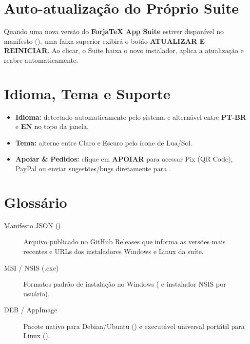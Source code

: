 \documentclass[11pt,a4paper]{article}
\begin{document}
\section{Auto-atualização do Próprio Suite}
Quando uma nova versão do \textbf{ForjaTeX App Suite} estiver disponível no manifesto (), uma faixa superior exibirá o botão \textbf{ATUALIZAR E REINICIAR}. Ao clicar, o Suite baixa o novo instalador, aplica a atualização e reabre automaticamente.

\section{Idioma, Tema e Suporte}
\begin{itemize}
  \item \textbf{Idioma:} detectado automaticamente pelo sistema e alternável entre \textbf{PT-BR} e \textbf{EN} no topo da janela.
  \item \textbf{Tema:} alterne entre Claro e Escuro pelo ícone de Lua/Sol.
  \item \textbf{Apoiar \& Pedidos:} clique em \textbf{APOIAR} para acessar Pix (QR Code), PayPal ou enviar sugestões/bugs diretamente para .
\end{itemize}

\section{Glossário}
\begin{description}
  \item[Manifesto JSON ()] Arquivo publicado no GitHub Releases que informa as versões mais recentes e URLs dos instaladores Windows e Linux da suíte.
  \item[MSI / NSIS (.exe)] Formatos padrão de instalação no Windows ( e instalador NSIS por usuário).
  \item[DEB / AppImage] Pacote nativo para Debian/Ubuntu () e executável universal portátil para Linux ().
\end{description}
\end{document}
